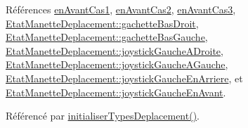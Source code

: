 Références \hyperlink{manette_8h_source_l00221}{en\+Avant\+Cas1}, \hyperlink{manette_8h_source_l00222}{en\+Avant\+Cas2}, \hyperlink{manette_8h_source_l00223}{en\+Avant\+Cas3}, \hyperlink{manette_8h_source_l00185}{Etat\+Manette\+Deplacement\+::gachette\+Bas\+Droit}, \hyperlink{manette_8h_source_l00184}{Etat\+Manette\+Deplacement\+::gachette\+Bas\+Gauche}, \hyperlink{manette_8h_source_l00183}{Etat\+Manette\+Deplacement\+::joystick\+Gauche\+A\+Droite}, \hyperlink{manette_8h_source_l00182}{Etat\+Manette\+Deplacement\+::joystick\+Gauche\+A\+Gauche}, \hyperlink{manette_8h_source_l00181}{Etat\+Manette\+Deplacement\+::joystick\+Gauche\+En\+Arriere}, et \hyperlink{manette_8h_source_l00180}{Etat\+Manette\+Deplacement\+::joystick\+Gauche\+En\+Avant}.



Référencé par \hyperlink{manette_8cpp_source_l00085}{initialiser\+Types\+Deplacement()}.


